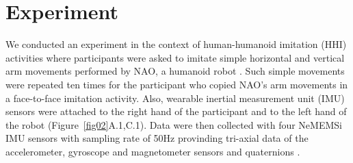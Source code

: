 \documentclass[fleqn,10pt]{wlscirep}
\begin{document}
\section*{Experiment} \label{sec:experiment}
We conducted an experiment in the context of human-humanoid imitation (HHI) 
activities where participants were asked to imitate simple horizontal and 
vertical arm movements performed by NAO, a humanoid robot \cite{gouaillier2009}.
Such simple movements were repeated ten times for the participant 
who copied NAO's arm movements in a face-to-face imitation activity.
Also, wearable inertial measurement unit (IMU) sensors were attached 
to the right hand of the participant and to the left hand of the robot 
(Figure~\ref{fig02}A.1,C.1). Data were then collected with four NeMEMSi
IMU sensors with sampling rate of 50Hz provinding tri-axial data of the 
accelerometer, gyroscope and magnetometer sensors and quaternions 
\cite{Comotti2014}.
\end{document}
